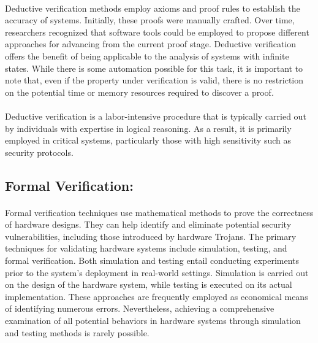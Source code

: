 \paragraph*{}
Deductive verification methods employ axioms and proof rules to establish the accuracy of systems. Initially, these proofs were manually crafted. Over time, researchers recognized that software tools could be employed to propose different approaches for advancing from the current proof stage. Deductive verification offers the benefit of being applicable to the analysis of systems with infinite states. While there is some automation possible for this task, it is important to note that, even if the property under verification is valid, there is no restriction on the potential time or memory resources required to discover a proof.
\paragraph*{}
Deductive verification is a labor-intensive procedure that is typically carried out by individuals with expertise in logical reasoning. As a result, it is primarily employed in critical systems, particularly those with high sensitivity such as security protocols.
\subsection{Formal Verification:}
\paragraph*{}
Formal verification techniques use mathematical methods to prove the correctness of hardware designs. They can help identify and eliminate potential security vulnerabilities, including those introduced by hardware Trojans. The primary techniques for validating hardware systems include simulation, testing, and formal verification. Both simulation and testing entail conducting experiments prior to the system's deployment in real-world settings. Simulation is carried out on the design of the hardware system, while testing is executed on its actual implementation. These approaches are frequently employed as economical means of identifying numerous errors. Nevertheless, achieving a comprehensive examination of all potential behaviors in hardware systems through simulation and testing methods is rarely possible.
